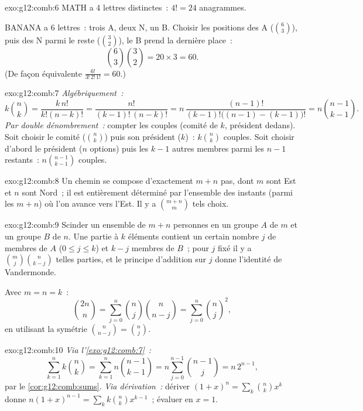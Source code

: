 \begin{solution}{exo:g12:comb:6}
MATH a 4 lettres distinctes~: $4! = 24$ anagrammes.

BANANA a 6 lettres~: trois A, deux N, un B. Choisir les positions des A
($\binom63$), puis des N parmi le reste ($\binom32$), le B prend la
dernière place~:
\[
\binom{6}{3}\binom{3}{2} = 20 \times 3 = 60 .
\]
(De façon équivalente $\frac{6!}{3!\,2!\,1!} = 60$.)
\end{solution}

\begin{solution}{exo:g12:comb:7}
\emph{Algébriquement~:}
\[
k\binom nk = \frac{k\,n!}{k!(n-k)!} = \frac{n!}{(k-1)!\,(n-k)!}
= n\,\frac{(n-1)!}{(k-1)!\bigl((n-1)-(k-1)\bigr)!} = n\binom{n-1}{k-1}.
\]
\emph{Par double dénombrement~:} compter les couples (comité de $k$,
président dedans). Soit choisir le comité ($\binom nk$) puis son
président ($k$)~: $k\binom nk$ couples. Soit choisir d'abord le président
($n$ options) puis les $k-1$ autres membres parmi les $n-1$ restants~:
$n\binom{n-1}{k-1}$ couples.
\end{solution}

\begin{solution}{exo:g12:comb:8}
Un chemin se compose d'exactement $m + n$ pas, dont $m$ sont Est et $n$
sont Nord~; il est entièrement déterminé par l'ensemble des instants
(parmi les $m+n$) où l'on avance vers l'Est. Il y a $\binom{m+n}{m}$
tels choix.
\end{solution}

\begin{solution}{exo:g12:comb:9}
Scinder un ensemble de $m + n$ personnes en un groupe $A$ de $m$ et un
groupe $B$ de $n$. Une partie à $k$ éléments contient un certain nombre
$j$ de membres de $A$ ($0 \leq j \leq k$) et $k - j$ membres de $B$~; pour
$j$ fixé il y a $\binom mj \binom{n}{k-j}$ telles parties, et le principe
d'addition sur $j$ donne l'identité de Vandermonde.

Avec $m = n = k$~:
\[
\binom{2n}{n} = \sum_{j=0}^n \binom nj \binom{n}{n-j}
= \sum_{j=0}^n \binom nj^{2},
\]
en utilisant la symétrie $\binom{n}{n-j} = \binom nj$.
\end{solution}

\begin{solution}{exo:g12:comb:10}
\emph{Via l'\cref{exo:g12:comb:7}~:}
\[
\sum_{k=1}^n k\binom nk = \sum_{k=1}^n n\binom{n-1}{k-1}
= n\sum_{j=0}^{n-1}\binom{n-1}{j} = n\,2^{n-1},
\]
par le \cref{cor:g12:comb:sums}. \emph{Via dérivation~:} dériver
$(1+x)^n = \sum_k \binom nk x^k$ donne
$n(1+x)^{n-1} = \sum_k k \binom nk x^{k-1}$~; évaluer en $x = 1$.
\end{solution}

